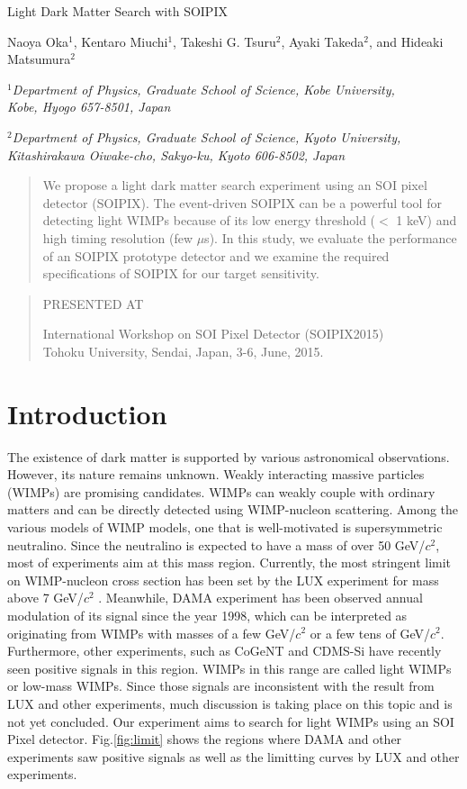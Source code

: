 \documentclass[12pt]{article}
\newcommand\pubnumber{}
\newcommand\pubdate{\today}
\def\kobe{Department of Physics, Graduate School of Science, Kobe University,\\
Kobe, Hyogo 657-8501, Japan}
\def\kyoto{Department of Physics, Graduate School of Science, Kyoto University,\\
Kitashirakawa Oiwake-cho, Sakyo-ku, Kyoto 606-8502, Japan}
\def\Title#1{\begin{center} {\Large #1 } \end{center}}
\def\Author#1{\begin{center}{ \sc #1} \end{center}}
\def\Address#1{\begin{center}{ \it #1} \end{center}}
\newcommand\pubblock{\rightline{\begin{tabular}{l} \pubnumber\\
         \pubdate  \end{tabular}}}
\newenvironment{Abstract}{\begin{quotation}  }{\end{quotation}}
\newenvironment{Presented}{\begin{quotation} \begin{center} 
             PRESENTED AT\end{center}\bigskip 
      \begin{center}\begin{large}}{\end{large}\end{center} \end{quotation}}
\begin{document}
\begin{titlepage}
\pubblock

\vfill
\Title{Light Dark Matter Search with SOIPIX}
\vfill
\Author{Naoya Oka$^1$, Kentaro Miuchi$^1$, Takeshi G. Tsuru$^2$, Ayaki Takeda$^2$, and Hideaki Matsumura$^2$}
\Address{$^1$\kobe}
\Address{$^2$\kyoto}

\vfill
\begin{Abstract}
We propose a light dark matter search experiment using an SOI pixel detector (SOIPIX).  The event-driven SOIPIX can be a powerful tool for detecting light WIMPs because of its low energy threshold ($<$ 1 keV) and high timing resolution (few $\mu$s). In this study, we evaluate the performance of an SOIPIX prototype detector and we examine the required specifications of SOIPIX for our target sensitivity.

\end{Abstract}
\vfill
\begin{Presented}
International Workshop on SOI Pixel Detector (SOIPIX2015)\\ 
Tohoku University, Sendai, Japan, 3-6, June, 2015.
\end{Presented}
\vfill
\end{titlepage}
\def\thefootnote{\fnsymbol{footnote}}
\setcounter{footnote}{0}
%

\section{Introduction}

The existence of dark matter is supported by various astronomical observations.  However, its nature remains unknown.  Weakly interacting massive particles (WIMPs) are promising candidates.  WIMPs can weakly couple with ordinary matters and can be directly detected using WIMP-nucleon scattering.  Among the various models of WIMP models, one that is well-motivated is supersymmetric neutralino.  Since the neutralino is expected to have a mass of over 50 GeV/$c^2$, most of experiments aim at this mass region.  Currently, the most stringent limit on WIMP-nucleon cross section has been set by the LUX experiment for mass above 7 GeV/$c^2$ \cite{Akerib:2013tjd}.  Meanwhile, DAMA experiment has been observed annual modulation of its signal since the year 1998\cite{Bernabei:2013xsa}, which can be interpreted as originating from WIMPs with masses of a few GeV/$c^2$ or a few tens of GeV/$c^2$.  Furthermore, other experiments, such as CoGeNT\cite{Aalseth:2014eft} and CDMS-Si\cite{Agnese:2013rvf} have recently seen positive signals in this region.  WIMPs in this range are called light WIMPs or low-mass WIMPs.  Since those signals are inconsistent with the result from LUX and other experiments, much discussion is taking place on this topic and is not yet concluded. Our experiment aims to search for light WIMPs using an SOI Pixel detector. Fig.\ref{fig:limit} shows the regions where DAMA and other experiments saw positive signals as well as the limitting curves by LUX and other experiments.
\end{document}
